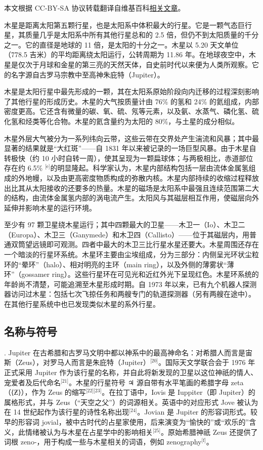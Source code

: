 
本文根据 CC-BY-SA 协议转载翻译自维基百科\href{https://en.wikipedia.org/wiki/Jupiter}{相关文章}。


木星是距离太阳第五颗行星，也是太阳系中体积最大的行星。它是一颗气态巨行星，其质量几乎是太阳系中所有其他行星总和的 2.5 倍，但仍不到太阳质量的千分之一。它的直径是地球的 11 倍，是太阳的十分之一。木星以 5.20 天文单位（778.5 吉米）的平均距离绕太阳运行，公转周期为 11.86 年。在地球夜空中，木星是仅次于月球和金星的第三亮的天然天体，自史前时代以来便为人类所观察。它的名字源自古罗马宗教中至高神朱庇特（Jupiter）。

木星是太阳行星中最先形成的一颗，其在太阳系原始阶段向内迁移的过程深刻影响了其他行星的形成历史。木星的大气按质量计由 76\% 的氢和 24\% 的氦组成，内部密度更高。它还含有微量的碳、氧、硫、氖等元素，以及氨、水蒸气、磷化氢、硫化氢和烃类等化合物。木星的氦含量约为太阳的 80\%，与土星的成分相似。

木星外层大气被分为一系列纬向云带，这些云带在交界处产生湍流和风暴；其中最显著的结果就是“大红斑”——自 1831 年以来被记录的一场巨型风暴。由于木星自转极快（约 10 小时自转一周），使其呈现为一颗扁球体；与两极相比，赤道部位存在约 6.5\% \(^\text{[e]}\)的明显隆起。科学家认为，木星内部结构包括一层由流体金属氢组成的外地幔，以及由更高密度物质构成的弥散内核。木星内部持续的收缩过程释放出比其从太阳接收的还要多的热量。木星的磁场是太阳系中最强且连续范围第二大的结构，由流体金属氢内部的涡电流产生。太阳风与其磁层相互作用，使磁层向外延伸并影响木星的运行环境。

至少有 97 颗卫星绕木星运行；其中四颗最大的卫星——木卫一（Io）、木卫二（Europa）、木卫三（Ganymede）和木卫四（Callisto）——位于其磁层内，用普通双筒望远镜即可观测。四者中最大的木卫三比行星水星还要大。木星周围还存在一个暗淡的行星环系统。木星环主要由尘埃组成，分为三部分：内侧呈光环状尘粒环的“晕环”（halo）、相对明亮的主环（main ring），以及外侧的薄雾状“薄环”（gossamer ring）。这些行星环在可见光和近红外光下呈现红色。木星环系统的年龄尚不清楚，可能追溯至木星形成时期。自 1973 年以来，已有九个机器人探测器访问过木星：包括七次飞掠任务和两艘专门的轨道探测器（另有两艘在途中）。在其他行星系统中也已发现类似木星的系外行星。
\subsection{名称与符号}.
Jupiter 在古希腊和古罗马文明中都以神系中的最高神命名：对希腊人而言是宙斯（Zeus），对罗马人而言是朱庇特（Jupiter）\(^\text{[20]}\)。国际天文学联合会于 1976 年正式采用 Jupiter 作为该行星的名称，并自此将新发现的卫星以这位神祇的情人、宠爱者及后代命名\(^\text{[21]}\)。木星的行星符号 ♃ 源自带有水平笔画的希腊字母 zeta（⟨Ƶ⟩），作为 Zeus 的缩写\(^\text{[22][23]}\)。在拉丁语中，Iovis 是 Iuppiter（即 Jupiter）的属格形式，并与 Zeus（“天空之父”）的词源相关。英语中的对应形式 Jove 被认为在 14 世纪起作为该行星的诗性名称出现\(^\text{[24]}\)。Jovian 是 Jupiter 的形容词形式。较早的形容词 jovial，被中古时代的占星家使用，后来演变为“愉快的”或“欢乐的”含义，此情绪被认为与木星在占星学中的影响相关\(^\text{[25]}\)。原始希腊神祇 Zeus 还提供了词根 zeno-，用于构成一些与木星相关的词语，例如 zenography\(^\text{[f]}\)。
